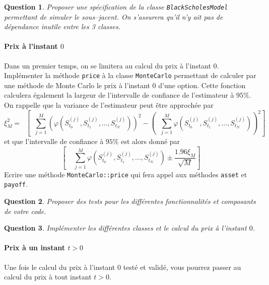 \documentclass[a4paper,11pt]{article}
\def\inv#1{\mathop{\frac{1}{ #1}}\nolimits}
\def\expp#1{\mathop {\mathrm{e}^{ #1}}}
\def\var#1{{\tt #1}}
\newtheorem{question}{Question}
\begin{document}
\begin{question}
  Proposer une spécification de la classe \verb!BlackScholesModel! permettant de simuler le
  sous--jacent. On s'assurera qu'il n'y ait pas de dépendance inutile entre les
  3 classes.
\end{question}


\paragraph{Prix à l'instant $0$}

Dans un premier temps, on se limitera au calcul du prix à l'instant $0$.
Implémenter la méthode \var{price} à la classe \var{MonteCarlo} permettant de
calculer par une méthode de Monte Carlo le prix à l'instant $0$ d'une option.
Cette fonction calculera également la largeur de l'intervalle de confiance de
l'estimateur à $95\%$. On rappelle que la
variance de l'estimateur peut être approchée par
\begin{equation*}
  \xi_M^2 = \expp{-2rT} \left[\inv{M} \sum_{j=1}^M (\varphi(S_{t_0}^{(j)},
  S_{t_1}^{(j)}, \dots, S_{t_N}^{(j)}))^2 - \left(\inv{M} \sum_{j=1}^M
  \varphi(S_{t_0}^{(j)}, S_{t_1}^{(j)}, \dots, S_{t_N}^{(j)}) \right)^2 \right]
\end{equation*}
et que l'intervalle de confiance à $95\%$ est alors donné par
\begin{equation*}
  \left[\expp{-rT} \inv{M} \sum_{j=1}^M \varphi(S_{t_0}^{(j)}, S_{t_1}^{(j)}, \dots,
  S_{t_N}^{(j)}) \pm \frac{1.96 \xi_M}{\sqrt{M}} \right]
\end{equation*}
Ecrire une méthode \var{MonteCarlo::price} qui fera appel aux méthodes \var{asset} et
\var{payoff}.

\begin{question}
  Proposer des tests pour les différentes fonctionnalités et composants de votre code.
\end{question}

\begin{question}
  Implémenter les différentes classes et le calcul du prix à l'instant $0$.
\end{question}

\paragraph{Prix à un instant $t > 0$}

Une fois le calcul du prix à l'instant $0$ testé et validé, vous pourrez passer
au calcul du prix à tout instant $t > 0$. \\
\end{document}
